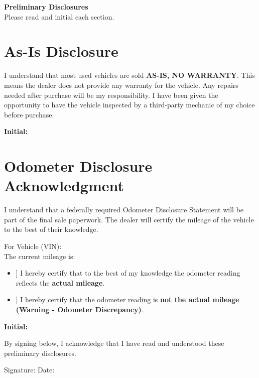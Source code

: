 \documentclass[12pt]{article}
\newcommand{\checkbox}{\framebox[1.2em]{\phantom{X}}}
\begin{document}
\begin{center}
    {\huge \bfseries Preliminary Disclosures} \\
    \vspace{4mm}
    \large Please read and initial each section.
\end{center}

\section*{As-Is Disclosure}
I understand that most used vehicles are sold \textbf{AS-IS, NO WARRANTY}. This means the dealer does not provide any warranty for the vehicle. Any repairs needed after purchase will be my responsibility. I have been given the opportunity to have the vehicle inspected by a third-party mechanic of my choice before purchase.

\vspace{4mm}
\noindent\textbf{Initial:} \hrulefill

\section*{Odometer Disclosure Acknowledgment}
I understand that a federally required Odometer Disclosure Statement will be part of the final sale paperwork. The dealer will certify the mileage of the vehicle to the best of their knowledge.

For Vehicle (VIN): \hrulefill \\
The current mileage is: \hrulefill

\begin{itemize}
    \item[\checkbox] I hereby certify that to the best of my knowledge the odometer reading reflects the \textbf{actual mileage}.
    \item[\checkbox] I hereby certify that the odometer reading is \textbf{not the actual mileage (Warning - Odometer Discrepancy)}.
\end{itemize}

\vspace{4mm}
\noindent\textbf{Initial:} \hrulefill

\vspace{10mm}

\noindent By signing below, I acknowledge that I have read and understood these preliminary disclosures.

\vspace{6mm}

\noindent Signature: \hrulefill \quad Date: \hrulefill
\end{document}
